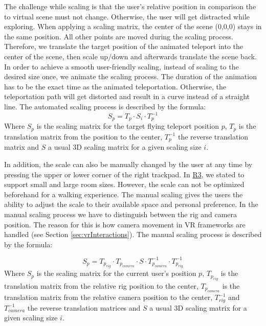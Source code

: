 \label{sec:scaling}
The challenge while scaling is that the user's relative position in comparison the to virtual scene must not change. Otherwise, the user will get distracted while exploring.
When applying a scaling matrix, the center of the scene (0,0,0) stays in the same position. All other points are moved during the scaling process. 
Therefore, we translate the target position of the animated teleport into the center of the scene, then scale up/down and afterwards translate the scene back.
In order to achieve a smooth user-friendly scaling, instead of scaling to the desired size once, we animate the scaling process. The duration of the animation has to be the exact time as the animated teleportation. 
Otherwise, the teleportation path will get distorted and result in a curve instead of a straight line.
The automated scaling process is described by the formula:
\begin{equation}
    S_{ p } = T_{ p } \cdot S_{ i } \cdot T_{ p }^{ -1 }
\end{equation}
Where $S_{ p }$ is the scaling matrix for the target flying teleport position $p$, $T_{ p }$ is the translation matrix from the position to the center, $T_{ p }^{ -1 }$ the reverse translation matrix and $S$ a usual 3D scaling matrix for a given scaling size $i$.

In addition, the scale can also be manually changed by the user at any time by pressing the upper or lower corner of the right trackpad. 
In \hyperref[req:R3]{R3}, we stated to support small and large room sizes.
However, the scale can not be optimized beforehand for a walking experience. The manual scaling gives the users the ability to adjust the scale to their available space and personal preference.
In the manual scaling process we have to distinguish between the rig and camera position. The reason for this is how camera movement in VR frameworks are handled (see Section \ref{sec:vrInteractions}).
The manual scaling process is described by the formula:

\begin{equation}
    S_{ p } = T_{ p_{ rig } } \cdot T_{ p_{ camera } } \cdot S \cdot T_{ p_{ camera } }^{ -1 } \cdot T_{ p_{ rig } }^{ -1 }
\end{equation}
Where $S_{ p }$ is the scaling matrix for the current user's position $p$, $T_{ p_{ rig } }$ is the translation matrix from the relative rig position to the center, $T_{ p_{ camera } }$ is the translation matrix from the relative camera position to the center, $T_{ rig }^{ -1 }$ and $T_{ camera }^{ -1 }$ the reverse translation matrices and $S$ a usual 3D scaling matrix for a given scaling size $i$.

